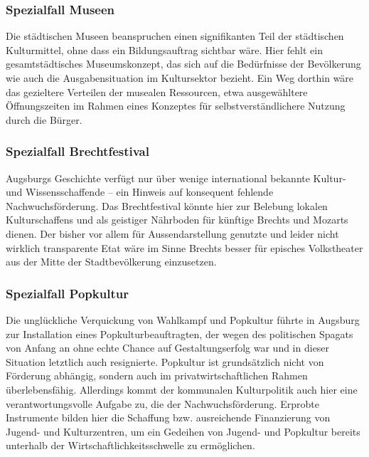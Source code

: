   \subsubsection{Spezialfall Museen}
  
  Die städtischen Museen beanspruchen einen signifikanten Teil der 
  städtischen Kulturmittel, ohne dass ein Bildungsauftrag sichtbar wäre. Hier 
  fehlt ein gesamtstädtisches Museumskonzept, das sich auf die Bedürfnisse 
  der Bevölkerung wie auch die Ausgabensituation im Kultursektor bezieht. Ein 
  Weg dorthin wäre das gezieltere Verteilen der musealen Ressourcen, etwa 
  ausgewähltere Öffnungszeiten im Rahmen eines Konzeptes für 
  selbstverständlichere Nutzung durch die Bürger.
  
  \subsubsection{Spezialfall Brechtfestival}
  
  Augsburgs Geschichte verfügt nur über wenige international bekannte Kultur- 
  und Wissensschaffende -- ein Hinweis auf konsequent fehlende 
  Nachwuchsförderung. Das Brechtfestival könnte hier zur Belebung lokalen 
  Kulturschaffens und als geistiger Nährboden für künftige Brechts und 
  Mozarts dienen. Der bisher vor allem für Aussendarstellung genutzte und 
  leider nicht wirklich transparente Etat wäre im Sinne Brechts besser für 
  episches Volkstheater aus der Mitte der Stadtbevölkerung einzusetzen.
  
  \subsubsection{Spezialfall Popkultur}
  
  Die unglückliche Verquickung von Wahlkampf und Popkultur führte in Augsburg 
  zur Installation eines Popkulturbeauftragten, der wegen des politischen 
  Spagats von Anfang an ohne echte Chance auf Gestaltungserfolg war und in 
  dieser Situation letztlich auch resignierte. Popkultur ist grundsätzlich 
  nicht von Förderung abhängig, sondern auch im privatwirtschaftlichen Rahmen 
  überlebensfähig. Allerdings kommt der kommunalen Kulturpolitik auch hier 
  eine verantwortungsvolle Aufgabe zu, die der Nachwuchsförderung. Erprobte 
  Instrumente bilden hier die Schaffung bzw. ausreichende Finanzierung von 
  Jugend- und Kulturzentren, um ein Gedeihen von Jugend- und Popkultur 
  bereits unterhalb der Wirtschaftlichkeitsschwelle zu ermöglichen. 
  
